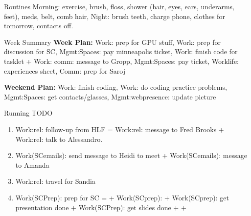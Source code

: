 \begin{frame}
\begin{columns}
\begin{column}{0.50\linewidth}
      \begin{block}{Routines}
        Morning: exercise, brush, \underline{floss}, shower (hair, eyes, ears,
        underarms, feet), meds,  belt, comb hair, Night: brush teeth, charge
        phone, clothes for tomorrow, contacts off.  
      \end{block} 

      \begin{block}{Week Summary}
        {\tiny \textbf{Week Plan:} 
          Work: prep for GPU stuff, Work: prep for discussion for SC, 
          Mgmt:Spaces: pay minneapolis ticket,  
          Work: finish code for tasklet +
          Work: comm: message to Gropp,
          Mgmt:Spaces: pay ticket, 
          Worklife: experiences sheet, Comm: prep for Saroj
        } 

        {\tiny \textbf{Weekend Plan:} Work: finish coding, Work: do 
          coding practice problems, Mgmt:Spaces: get contacts/glasses,
        Mgmt:webpresence: update picture }  
      \end{block}


      \begin{block}{Running TODO} %
        \begin{enumerate}

        \tiny \item \small Work:rel: follow-up from HLF = Work:rel: message to
          Fred Brooks + Work:rel: talk to Alessandro. 


        \item \tiny Work(SCemails): send message to Heidi to meet +
          Work(SCemails): message to Amanda  

        \item \tiny Work:rel: travel for Sandia 

        \item \tiny Work(SCPrep): prep for SC =  + Work(SCprep):   +
          Work(SCprep): get presentation done  +
          Work(SCPrep): get slides done +   +


\end{enumerate}
\end{block}
\end{column}
\end{columns}
\end{frame}
